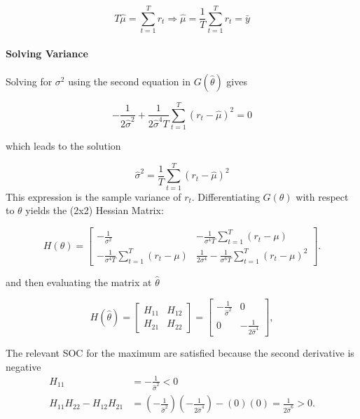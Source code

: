 \documentclass[11pt]{article}
\begin{document}
\begin{equation}
T \widehat{\mu}=\sum_{t=1}^T r_t \Rightarrow \widehat{\mu}=\frac{1}{T} \sum_{t=1}^T r_t=\bar{y}
\end{equation}

\paragraph{Solving Variance} \mbox{}

Solving for $\sigma^2$ using the second equation in $G(\hat{\theta})$ gives

\begin{equation}
-\frac{1}{2 \widehat{\sigma}^2}+\frac{1}{2 \widehat{\sigma}^4 T} \sum_{t=1}^T\left(r_t-\widehat{\mu}\right)^2=0
\end{equation}

which leads to the solution 

\begin{equation}
\widehat{\sigma}^2=\frac{1}{T} \sum_{t=1}^T\left(r_t-\widehat{\mu}\right)^2
\end{equation}
This expression is the sample variance of $r_t$. Differentiating $G(\theta)$ with respect to $\theta$ yields the (2x2) Hessian Matrix:

\begin{equation}
H(\theta)=\left[\begin{array}{cc}
-\frac{1}{\sigma^2} & -\frac{1}{\sigma^4 T} \sum_{t=1}^T\left(r_t-\mu\right) \\
-\frac{1}{\sigma^4 T} \sum_{t=1}^T\left(r_t-\mu\right) & \frac{1}{2 \sigma^4}-\frac{1}{\sigma^6 T} \sum_{t=1}^T\left(r_t-\mu\right)^2
\end{array}\right] .
\end{equation}

and then evaluating the matrix at $\hat{\theta}$

\begin{equation}
H(\widehat{\theta})=\left[\begin{array}{ll}
H_{11} & H_{12} \\
H_{21} & H_{22}
\end{array}\right]=\left[\begin{array}{cc}
-\frac{1}{\widehat{\sigma}^2} & 0 \\
0 & -\frac{1}{2 \widehat{\sigma}^4}
\end{array}\right],
\end{equation}

The relevant SOC for the maximum are satisfied because the second derivative is negative
\begin{equation}
\begin{aligned}
H_{11} & =-\frac{1}{\widehat{\sigma}^2}<0 \\
H_{11} H_{22}-H_{12} H_{21} & =\left(-\frac{1}{\widehat{\sigma}^2}\right)\left(-\frac{1}{2 \widehat{\sigma}^4}\right)-(0)(0)=\frac{1}{2 \widehat{\sigma}^6}>0 .
\end{aligned}
\end{equation}
\end{document}
